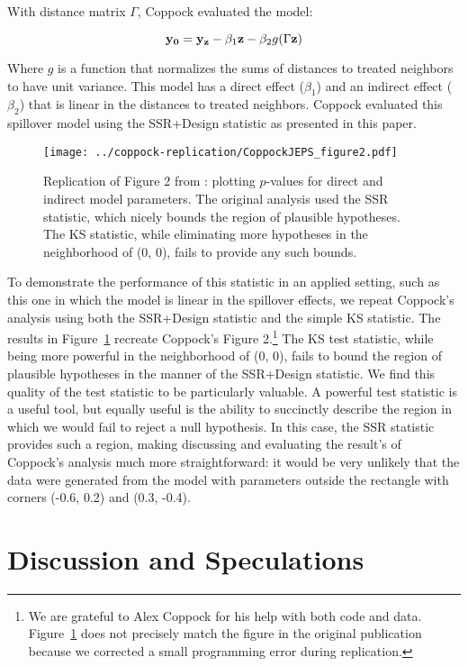 With distance matrix $\Gamma$, Coppock evaluated the model:

$$\mathbf{y}_{\mathbf{0}} = \mathbf{y}_{\mathbf{z}} - \beta_1 \mathbf{z} - \beta_2 g(\Gamma \mathbf{z})$$

Where $g$ is a function that normalizes the sums of distances to treated
neighbors to have unit variance. This model has a direct
effect ($\beta_1$) and an indirect effect ($\beta_2$) that is linear in the distances to
treated neighbors. Coppock evaluated this spillover model using the SSR+Design statistic as
presented in this paper. 

\begin{figure}[H] \centering
  \texttt{[image: ../coppock-replication/CoppockJEPS\_figure2.pdf]}
  \caption{Replication of Figure 2 from \citet{coppock2014information}: plotting
    $p$-values for direct and indirect model parameters. The
    original analysis used the SSR statistic, which nicely bounds the region of
    plausible hypotheses. The KS statistic, while eliminating more hypotheses in
  the neighborhood of (0, 0), fails to provide any such bounds.}\label{fig:coppock-replication}
\end{figure}


To demonstrate the performance of this statistic in
an applied setting, such as this one in which  the model is linear in the spillover effects, we repeat
Coppock's analysis using both the SSR+Design statistic and the simple KS statistic. The
results in Figure~\ref{fig:coppock-replication} recreate Coppock's Figure
2.\footnote{We are grateful to Alex Coppock for his help with both code and
  data. Figure~\ref{fig:coppock-replication} does not precisely match the
  figure in the original publication because we corrected a small
  programming error during replication.}
 The KS test statistic, while being more powerful in the neighborhood of (0,
0), fails to bound the region of plausible hypotheses in the manner of the
SSR+Design statistic. We find this quality of the test statistic to be
particularly valuable. A powerful test statistic is a useful
tool, but equally useful is the ability to succinctly describe the region in
which we would fail to reject a null hypothesis. In this case, the SSR statistic
provides such a region, making discussing and evaluating the result's
of Coppock's analysis much more straightforward: it would be very unlikely that
the data were generated from the model with parameters outside the rectangle
with corners (-0.6, 0.2) and (0.3, -0.4).

\section{Discussion and Speculations}

